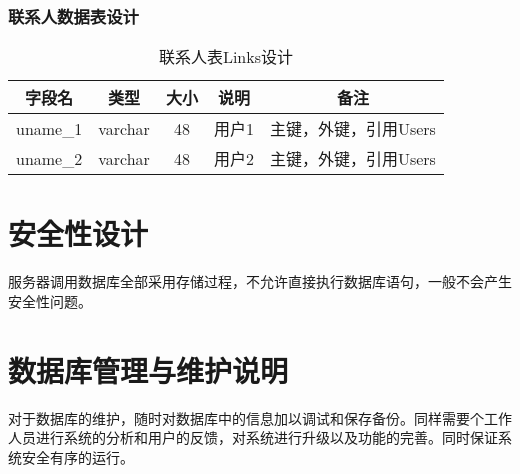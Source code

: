 \subsubsection{联系人数据表设计}
\begin{table}[htbp]
\centering
\caption{联系人表Links设计} \label{tab:order-database}
\begin{tabular}{|c|c|c|c|c|}
    \hline
    字段名 & 类型 & 大小 & 说明 & 备注 \\
    \hline
    uname\_1 & varchar & 48 & 用户1 & 主键，外键，引用Users\\
    \hline
    uname\_2 & varchar & 48 & 用户2 & 主键，外键，引用Users \\
    \hline
\end{tabular}
\end{table}
\section{安全性设计}
服务器调用数据库全部采用存储过程，不允许直接执行数据库语句，一般不会产生安全性问题。

\section{数据库管理与维护说明}
对于数据库的维护，随时对数据库中的信息加以调试和保存备份。同样需要个工作人员进行系统的分析和用户的反馈，对系统进行升级以及功能的完善。同时保证系统安全有序的运行。